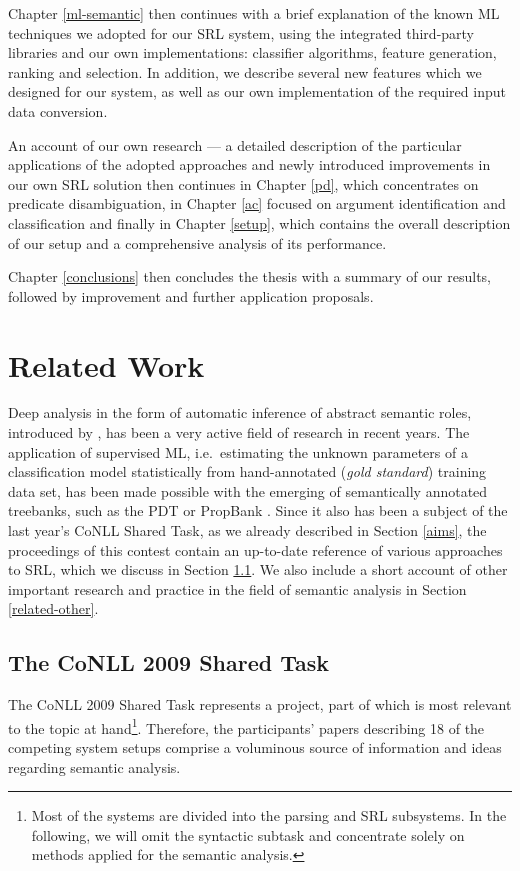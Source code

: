 \documentclass[12pt,notitlepage]{report}
\begin{document}
Chapter \ref{ml-semantic} then continues with a brief explanation of the known ML techniques we adopted for our SRL system, using the integrated third-party libraries and our own implementations: classifier algorithms, feature generation, ranking and selection. In addition, we describe several new features which we designed for our system, as well as our own implementation of the required input data conversion.

An account of our own research --- a detailed description of the particular applications of the adopted approaches and newly introduced improvements in our own SRL solution then continues in Chapter \ref{pd}, which concentrates on predicate disambiguation, in Chapter \ref{ac} focused on argument identification and classification and finally in Chapter \ref{setup}, which contains the overall description of our setup and a comprehensive analysis of its performance.

Chapter \ref{conclusions} then concludes the thesis with a summary of our results, followed by improvement and further application proposals.

%
%
\chapter{Related Work}\label{related}
%
%

Deep analysis in the form of automatic inference of abstract semantic roles, introduced by \citet{gildea02}, has been a very active field of research in recent years. The application of supervised ML, i.e.\ estimating the unknown parameters of a classification model statistically from hand-annotated (\emph{gold standard}) training data set, has been made possible with the emerging of semantically annotated treebanks, such as the PDT \citep{hajic06} or PropBank \citep{palmer05}. Since it also has been a subject of the last year's CoNLL Shared Task, as we already described in Section \ref{aims}, the proceedings of this contest contain an up-to-date reference of various approaches to SRL, which we discuss in Section \ref{conll2009}. We also include a short account of other important research and practice in the field of semantic analysis in Section \ref{related-other}.

\section{The CoNLL 2009 Shared Task}\label{conll2009}

The CoNLL 2009 Shared Task represents a project, part of which is most relevant to the topic at hand\footnote{Most of the systems are divided into the parsing and SRL subsystems. In the following, we will omit the syntactic subtask and concentrate solely on methods applied for the semantic analysis.}. Therefore, the participants' papers describing 18 of the competing system setups comprise a voluminous source of information and ideas regarding semantic analysis. 
\end{document}
